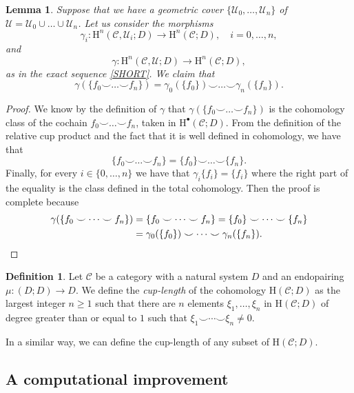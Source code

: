 \documentclass[12pt,reqno]{amsart}
\newtheorem{lemma}[teo]{Lemma}
\theoremstyle{definition}
\newtheorem{defi}[teo]{Definition}
\theoremstyle{remark}
\numberwithin{figure}{section}%
\newcommand{\CC}{\mathcal{C}}
\newcommand{\Ho}{\mathrm{H}}
\newcommand{\Uc}{\mathcal{U}}
\begin{document}
\begin{lemma}\label{Natural}
    Suppose that we have a geometric cover $\{\Uc_0, \ldots, \Uc_n\}$ of $\Uc=\Uc_0 \cup \ldots \cup \Uc_n$. %
    Let us consider the morphisms 
    $$\gamma_i \colon\Ho^n(\CC,\Uc_i;D) \rightarrow \Ho^n(\CC;D), \quad i=0,\dots,n,$$
   and
    $$\gamma \colon \Ho^n(\CC,\Uc;D) \rightarrow \Ho^n(\CC;D),$$
    as in the exact sequence \eqref{SHORT}. We claim that
    $$\gamma(\{f_0 \smile \dots \smile f_n\})=\gamma_0(\{f_0\}) \smile \dots  \smile \gamma_n (\{f_n\}).$$
\end{lemma}
\begin{proof}
 
We know by the definition of $\gamma$ that $\gamma(\{f_0 \smile \dots \smile f_n\})$ is the cohomology class of the cochain  $f_0 \smile \dots \smile f_n$,  taken in $\Ho^{\bullet}(\CC;D)$. From the definition of the relative cup product and the fact that it is well defined in cohomology, we have that $$\{f_0 \smile \dots \smile f_n\}=\{f_0\}\smile \dots \smile \{f_n\}.$$ Finally, for every $i\in\{0,\ldots, n\}$ we have that $\gamma_i\{f_i\}=\{f_i\}$ where the right part of the equality is the class defined in the total cohomology. Then the proof is complete because
\begin{align*}
        \gamma(\{f_0 \smile \dots \smile f_n\})&=\{f_0 \smile \dots \smile f_n\}=\{f_0\} \smile \dots \smile \{f_n\}\\&=\gamma_0(\{f_0\})\smile \dots \smile \gamma_n(\{f_n\}). \qedhere
    \end{align*}
\end{proof}


\begin{defi}
    Let $\CC$ be a category with a natural system $D$ and an endopairing $\mu \colon (D;D) \rightarrow D$. We define the {\em cup-length} of the cohomology $\Ho(\CC;D)$ as the largest integer $n\geq 1$ such that there are $n$ elements $\xi_1,\ldots,\xi_n$ in $\Ho(\CC;D)$ of degree greater than or equal to $1$ such that $\xi_1 \smile \cdots \smile \xi_n \neq 0$. 
    
    In a similar way, we can define the cup-length of any subset of $\Ho(\CC;D)$.
\end{defi}

\subsection{A computational improvement}
\end{document}
